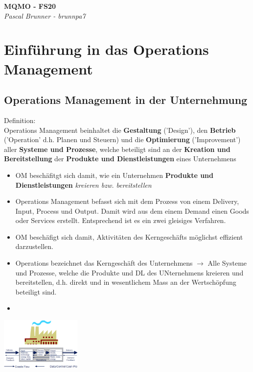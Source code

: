 \documentclass{report}
\newenvironment{Figure}
	{\par\medskip\noindent\minipage{\linewidth}}
	{\endminipage\par\medskip}
\theoremstyle{definition}
\theoremstyle{example}
\begin{document}
\begin{titlepage}
   \begin{center}
      \Large\textbf{MQMO - FS20}\\
      \large\textit{Pascal Brunner - brunnpa7}
   \end{center}
\end{titlepage}

\tableofcontents
\newpage

\chapter{Einführung in das Operations Management}

\section{Operations Management in der Unternehmung}
Definition:\\
Operations Management beinhaltet die \textbf{Gestaltung} ('Design'), den \textbf{Betrieb} ('Operation' d.h. Planen und Steuern) und die \textbf{Optimierung} ('Improvement') aller \textbf{Systeme und Prozesse}, 
welche beteiligt sind an der \textbf{Kreation und Bereitstellung} der \textbf{Produkte und Dienstleistungen} eines Unternehmens 
\begin{itemize}
   \item OM beschäfitgt sich damit, wie ein Unternehmen \textbf{Produkte und Dienstleistungen} \textit{kreieren bzw. bereitstellen}
	\item Operations Management befasst sich mit dem Prozess von einem Delivery, Input, Process und Output. Damit wird aus dem einem Demand einen Goods oder Services erstellt. Entsprechend ist es ein zwei gleisiges Verfahren. 
	\item OM beschäfigt sich damit, Aktivitäten des Kerngeschäfts möglichst effizient darzustellen.
	\item Operations bezeichnet das Kerngeschäft des Unternehmens $\rightarrow$ Alle Systeme und Prozesse, welche die Produkte und DL des UNternehmens kreieren und bereitstellen, d.h. direkt und in wesentlichem Mass an der Wertschöpfung beteiligt sind.
	\item 
\end{itemize}
\begin{Figure}
\centering
\includegraphics[width=150px]{img/OM.png}
	\label{fig:OM Model}
\end{Figure}
\end{document}
